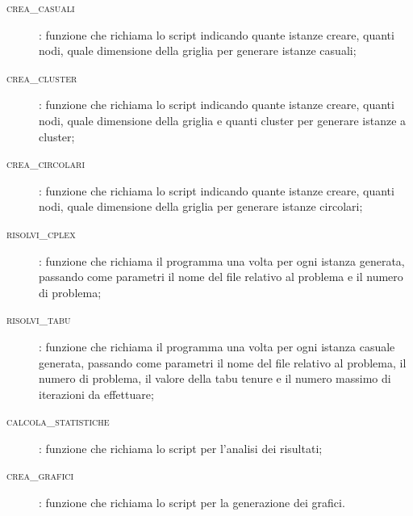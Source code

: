 \begin{description}
	\item[\textsc{crea\_casuali}]: funzione che richiama lo script  indicando quante istanze creare, quanti nodi, quale dimensione della griglia per generare istanze casuali;
	\item[\textsc{crea\_cluster}]: funzione che richiama lo script  indicando quante istanze creare, quanti nodi, quale dimensione della griglia e quanti cluster per generare istanze a cluster;
	\item[\textsc{crea\_circolari}]: funzione che richiama lo script  indicando quante istanze creare, quanti nodi, quale dimensione della griglia per generare istanze circolari;
	\item[\textsc{risolvi\_cplex}]: funzione che richiama il programma  una volta per ogni istanza generata, passando come parametri il nome del file relativo al problema e il numero di problema;
	\item[\textsc{risolvi\_tabu}]: funzione che richiama il programma  una volta per ogni istanza casuale generata, passando come parametri il nome del file relativo al problema, il numero di problema, il valore della tabu tenure e il numero massimo di iterazioni da effettuare;
	\item[\textsc{calcola\_statistiche}]: funzione che richiama lo script  per l'analisi dei risultati;
	\item[\textsc{crea\_grafici}]: funzione che richiama lo script  per la generazione dei grafici.
\end{description}



